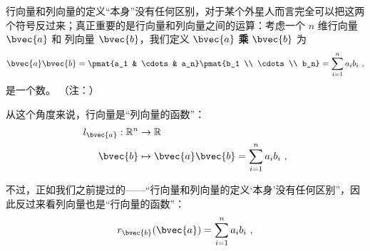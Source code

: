 行向量和列向量的定义“本身”没有任何区别，对于某个外星人而言完全可以把这两个符号反过来；真正重要的是行向量和列向量之间的运算：考虑一个 $n$ 维行向量 $\bvec{a}$ 和 列向量 $\bvec{b}$，我们定义 $\bvec{a}$ \textbf{乘} $\bvec{b}$ 为
\begin{equation}
\bvec{a} \bvec{b} = \pmat{a_1 & \cdots & a_n} \pmat{b_1 \\ \cdots \\ b_n} = \sum_{i = 1}^n a_i b_i~,
\end{equation}
是一个数。
（注：）


从这个角度来说，行向量是“列向量的函数”：
\begin{equation}
\begin{aligned}
l_{\bvec{a}}: \mathbb{R}^n &\to \mathbb{R} \\
\bvec{b} &\mapsto \bvec{a} \bvec{b} = \sum_{i = 1}^n a_i b_i~,
\end{aligned}
\end{equation}


不过，正如我们之前提过的——“行向量和列向量的定义‘本身’没有任何区别”，因此反过来看列向量也是“行向量的函数”：
\begin{equation}
r_{\bvec{b}}(\bvec{a}) = \sum_{i = 1}^n a_i b_i~,
\end{equation}